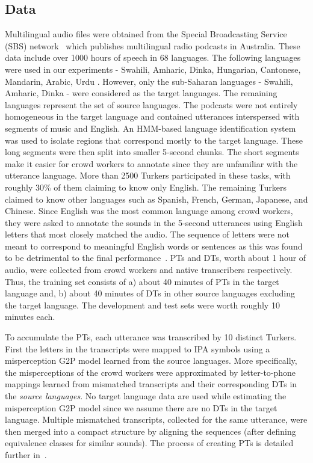 \documentclass[a4paper]{article}
\begin{document}
\subsection{Data} \vspace{-1mm}
Multilingual audio files were obtained from the Special Broadcasting Service (SBS) network~\cite{SBS} which publishes multilingual radio podcasts in Australia. These data include over 1000 hours of speech in 68 languages.
The following languages were used in our experiments - Swahili, Amharic, Dinka, Hungarian, Cantonese, Mandarin, Arabic, Urdu . However, only the sub-Saharan languages - Swahili, Amharic, Dinka - were considered as the target languages. The remaining languages represent the set of source languages. The podcasts were not entirely homogeneous in the target language and contained utterances interspersed with segments of music and English. An HMM-based language identification system was used to isolate regions that correspond mostly to the target language. These long segments were then split into smaller 5-second chunks. The short segments make it easier for crowd workers to annotate since they are unfamiliar with the utterance language. More than 2500 Turkers participated in these tasks, with roughly 30\% of them claiming to know only English. The remaining Turkers claimed to know other languages such as Spanish, French, German, Japanese, and Chinese. Since English was the most common language among crowd workers, they were asked to annotate the sounds in the 5-second utterances using English letters that most closely matched the audio. The sequence of letters were not meant to correspond to meaningful English words or sentences as this was found to be detrimental to the final performance~\cite{Jyothi2015}. PTs and DTs, worth about 1 hour of audio, were collected from crowd workers and native transcribers respectively. Thus, the training set consists of a) about 40 minutes of PTs in the target language and, b) about 40 minutes of DTs in other source languages  excluding the target language. The development and test sets were worth roughly 10 minutes each. 

To accumulate the PTs, each utterance was transcribed by 10 distinct Turkers. First the letters in the transcripts were mapped to IPA symbols using a misperception G2P model learned from the source languages. More specifically, the misperceptions of the crowd workers were approximated by letter-to-phone mappings learned from mismatched transcripts and their corresponding DTs in the \emph{source languages}. No target language data are used while estimating the misperception G2P model since we assume there are no DTs in the target language. Multiple mismatched transcripts, collected for the same utterance, were then merged into a compact structure by aligning the sequences (after defining equivalence classes for similar sounds). The process of creating PTs is detailed further in~\cite{Jyothi-MismatchedCrowdsourcingTrans}.
\end{document}
